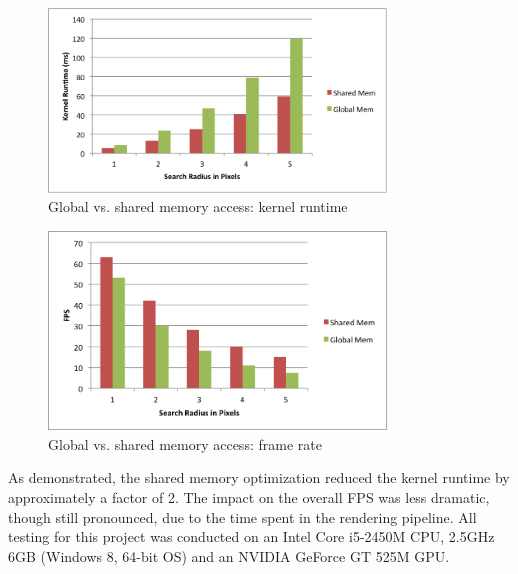 \documentclass{jcgt}
\begin{document}
\begin{figure}[htb]
  \centering
   \includegraphics[width=0.8\textwidth]{../../performance/SharedVsGlobalRuntime.png}
   \caption{\label{fig:GLPipeline}
    Global vs. shared memory access: kernel runtime}
\end{figure}

\begin{figure}[htb]
  \centering
   \includegraphics[width=0.8\textwidth]{../../performance/SharedVsGlobalFPS.png}
   \caption{\label{fig:GLPipeline}
    Global vs. shared memory access: frame rate}
\end{figure}

As demonstrated, the shared memory optimization reduced the kernel runtime by approximately a factor of 2. The impact on the overall FPS was less dramatic, though still pronounced, due to the time spent in the rendering pipeline. All testing for this project was conducted on an Intel Core i5-2450M CPU, 2.5GHz 6GB (Windows 8, 64-bit OS) and an NVIDIA GeForce GT 525M GPU.


%
\small


\end{document}
